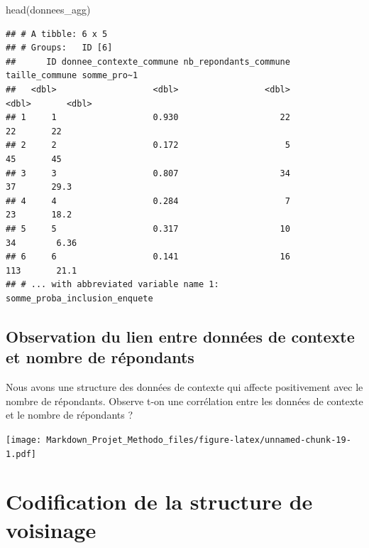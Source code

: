 \documentclass[
]{article}
\newenvironment{Shaded}{\begin{snugshade}}{\end{snugshade}}
\newcommand{\FunctionTok}[1]{\textcolor[rgb]{0.00,0.00,0.00}{#1}}
\newcommand{\NormalTok}[1]{#1}
\newcommand{\SpecialCharTok}[1]{\textcolor[rgb]{0.00,0.00,0.00}{#1}}
\begin{document}
\begin{Shaded}
\begin{Highlighting}[]
\FunctionTok{head}\NormalTok{(donnees\_agg)}
\end{Highlighting}
\end{Shaded}

\begin{verbatim}
## # A tibble: 6 x 5
## # Groups:   ID [6]
##      ID donnee_contexte_commune nb_repondants_commune taille_commune somme_pro~1
##   <dbl>                   <dbl>                 <dbl>          <dbl>       <dbl>
## 1     1                   0.930                    22             22       22   
## 2     2                   0.172                     5             45       45   
## 3     3                   0.807                    34             37       29.3 
## 4     4                   0.284                     7             23       18.2 
## 5     5                   0.317                    10             34        6.36
## 6     6                   0.141                    16            113       21.1 
## # ... with abbreviated variable name 1: somme_proba_inclusion_enquete
\end{verbatim}

\hypertarget{observation-du-lien-entre-donnuxe9es-de-contexte-et-nombre-de-ruxe9pondants}{%
\subsection{Observation du lien entre données de contexte et nombre de
répondants}\label{observation-du-lien-entre-donnuxe9es-de-contexte-et-nombre-de-ruxe9pondants}}

Nous avons une structure des données de contexte qui affecte
positivement avec le nombre de répondants. Observe t-on une corrélation
entre les données de contexte et le nombre de répondants ?

\begin{Shaded}
\end{Shaded}

\texttt{[image: Markdown\_Projet\_Methodo\_files/figure-latex/unnamed-chunk-19-1.pdf]}

\hypertarget{codification-de-la-structure-de-voisinage}{%
\section{Codification de la structure de
voisinage}\label{codification-de-la-structure-de-voisinage}}
\end{document}
